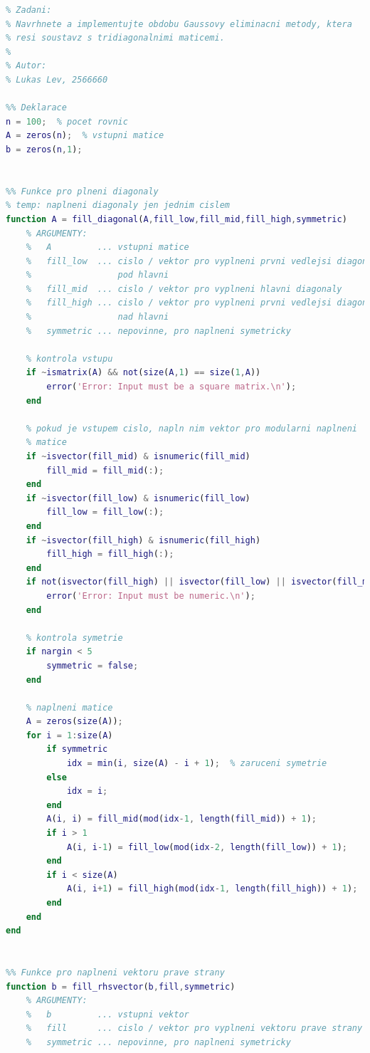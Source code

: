 \documentclass[12pt]{CLASS/protokol}
\begin{document}
\newpage
\begin{lstlisting}[language=MATLAB,label=ls:uf]
%% ===== 2NU, semestralni projekt =====
% Zadani:
% Navrhnete a implementujte obdobu Gaussovy eliminacni metody, ktera
% resi soustavz s tridiagonalnimi maticemi.
%
% Autor:
% Lukas Lev, 2566660

%% Deklarace
n = 100;  % pocet rovnic
A = zeros(n);  % vstupni matice
b = zeros(n,1);


%% Funkce pro plneni diagonaly
% temp: naplneni diagonaly jen jednim cislem
function A = fill_diagonal(A,fill_low,fill_mid,fill_high,symmetric)
    % ARGUMENTY:
    %   A         ... vstupni matice
    %   fill_low  ... cislo / vektor pro vyplneni prvni vedlejsi diagonaly
    %                 pod hlavni
    %   fill_mid  ... cislo / vektor pro vyplneni hlavni diagonaly
    %   fill_high ... cislo / vektor pro vyplneni prvni vedlejsi diagonaly
    %                 nad hlavni
    %   symmetric ... nepovinne, pro naplneni symetricky

    % kontrola vstupu
    if ~ismatrix(A) && not(size(A,1) == size(1,A))
        error('Error: Input must be a square matrix.\n');
    end

    % pokud je vstupem cislo, napln nim vektor pro modularni naplneni
    % matice
    if ~isvector(fill_mid) & isnumeric(fill_mid)
        fill_mid = fill_mid(:);
    end
    if ~isvector(fill_low) & isnumeric(fill_low)
        fill_low = fill_low(:);
    end
    if ~isvector(fill_high) & isnumeric(fill_high)
        fill_high = fill_high(:);
    end
    if not(isvector(fill_high) || isvector(fill_low) || isvector(fill_mid))
        error('Error: Input must be numeric.\n');
    end

    % kontrola symetrie
    if nargin < 5
        symmetric = false;
    end

    % naplneni matice
    A = zeros(size(A));
    for i = 1:size(A)
        if symmetric
            idx = min(i, size(A) - i + 1);  % zaruceni symetrie
        else
            idx = i;
        end
        A(i, i) = fill_mid(mod(idx-1, length(fill_mid)) + 1);
        if i > 1
            A(i, i-1) = fill_low(mod(idx-2, length(fill_low)) + 1);
        end
        if i < size(A)
            A(i, i+1) = fill_high(mod(idx-1, length(fill_high)) + 1);
        end
    end
end


%% Funkce pro naplneni vektoru prave strany
function b = fill_rhsvector(b,fill,symmetric)
    % ARGUMENTY:
    %   b         ... vstupni vektor
    %   fill      ... cislo / vektor pro vyplneni vektoru prave strany
    %   symmetric ... nepovinne, pro naplneni symetricky


\end{lstlisting}
\end{document}
